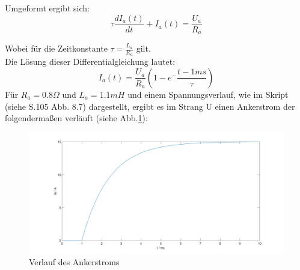 Umgeformt ergibt sich:
\begin{equation}
	\tau\frac{dI_a(t)}{dt} + I_a(t) = \frac{U_a}{R_a}
\end{equation}

Wobei für die Zeitkonstante $\tau = \frac{L_a}{R_a}$ gilt.\\
Die Lösung dieser Differentialgleichung lautet:
\begin{equation}
	I_a(t) = \frac{U_a}{R_a}(1-e^-\frac{t-1ms}{\tau})
\end{equation}
Für $R_a = 0.8 \Omega$ und $L_a = 1.1 mH$ und einem Spannungsverlauf, wie im Skript (siehe S.105 Abb. 8.7) dargestellt, ergibt es im Strang U einen Ankerstrom der folgendermaßen verläuft (siehe Abb.\ref{fig:ankerstrom}):
\begin{figure}[htb]
	\includegraphics[width=\textwidth]{./Bilder/Ankerstrom_Aufgabe2d}
	\caption{Verlauf des Ankerstroms}
	\label{fig:ankerstrom}
\end{figure}




%

\clearpage
